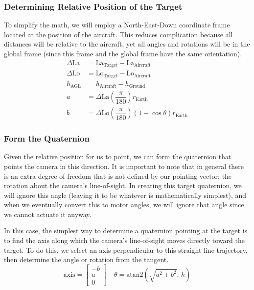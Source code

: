 \documentclass[letterpaper,10pt]{article}
\begin{document}
\subsubsection{Determining Relative Position of the Target}
To simplify the math, we will employ a North-East-Down coordinate frame located at the position of the aircraft. This reduces complication because all distances will be relative to the aircraft, yet all angles and rotations will be in the global frame (since this frame and the global frame have the same orientation).
\begin{align}
\Delta\mathrm{La} &= \mathrm{La}_\text{Target} - \mathrm{La}_\text{Aircraft} \\
\Delta\mathrm{Lo} &= \mathrm{Lo}_\text{Target} - \mathrm{Lo}_\text{Aircraft} \\
h_\text{AGL} &= h_\text{Aircraft} - h_\text{Ground} \\
a &= \Delta\mathrm{La} \left(\dfrac{\pi}{180}\right) r_\text{Earth} \\
b &= \Delta\mathrm{Lo} \left(\dfrac{\pi}{180}\right) \left(1-\cos\!\theta\right) r_\text{Earth}
\end{align}

\subsubsection{Form the Quaternion}
Given the relative position for us to point, we can form the quaternion that points the camera in this direction. It is important to note that in general there is an extra degree of freedom that is not defined by our pointing vector: the rotation about the camera's line-of-sight. In creating this target quaternion, we will ignore this angle (leaving it to be whatever is mathematically simplest), and when we eventually convert this to motor angles, we will ignore that angle since we cannot actuate it anyway.

In this case, the simplest way to determine a quaternion pointing at the target is to find the axis along which the camera's line-of-sight moves directly toward the target. To do this, we select an axis perpendicular to this straight-line trajectory, then determine the angle or rotation from the tangent.
\begin{equation*}
\text{axis} = \left[\begin{array}{c} -b \\ a \\ 0 \end{array}\right] \quad \theta = \mathrm{atan2}\!\left(\sqrt{a^2+b^2}, \,h\right)
\end{equation*}
\end{document}
